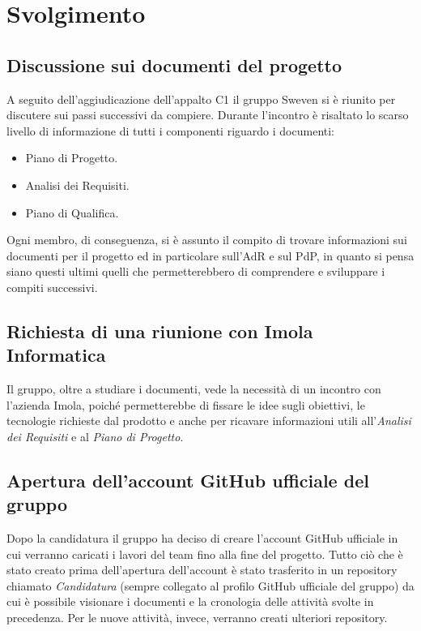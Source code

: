 \section{Svolgimento}
\subsection{Discussione sui documenti del progetto}
A seguito dell'aggiudicazione dell'appalto C1 il gruppo Sweven si è riunito per discutere sui passi successivi da compiere.
Durante l'incontro è risaltato lo scarso livello di informazione di tutti i componenti riguardo i documenti:
\begin{itemize}
    \item Piano di Progetto.
    \item Analisi dei Requisiti.
    \item Piano di Qualifica.
\end{itemize}
Ogni membro, di conseguenza, si è assunto il compito di trovare informazioni sui documenti per il progetto ed in particolare
sull'AdR e sul PdP, in quanto si pensa siano questi ultimi quelli che permetterebbero di comprendere e sviluppare i compiti successivi.

\subsection{Richiesta di una riunione con Imola Informatica}
Il gruppo, oltre a studiare i documenti, vede la necessità di un incontro con l'azienda Imola, poiché
permetterebbe di fissare le idee sugli obiettivi, le tecnologie richieste dal prodotto e anche per ricavare
informazioni utili all'\emph{Analisi dei Requisiti} e al \emph{Piano di Progetto}.

\subsection{Apertura dell'account GitHub ufficiale del gruppo}
Dopo la candidatura il gruppo ha deciso di creare l'account GitHub ufficiale in cui verranno caricati i lavori del team
fino alla fine del progetto. Tutto ciò che è stato creato prima dell'apertura dell'account è stato trasferito
in un repository chiamato \emph{Candidatura} (sempre collegato al profilo GitHub ufficiale del gruppo)
da cui è possibile visionare i documenti e la cronologia delle attività svolte in precedenza. 
Per le nuove attività, invece, verranno creati ulteriori repository.